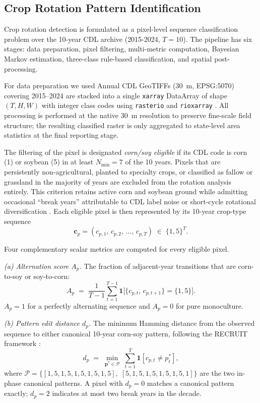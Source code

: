 \documentclass{article}
\begin{document}
\subsection{Crop Rotation Pattern Identification}
\label{sec:pattern_id}

Crop rotation detection is formulated as a pixel-level sequence classification
problem over the 10-year CDL archive (2015-2024, $T=10$).
The pipeline has six stages: data preparation, pixel filtering,
multi-metric computation, Bayesian Markov estimation, three-class rule-based
classification, and spatial post-processing.

For data preparation we used Annual CDL GeoTIFFs (30~m, EPSG:5070) covering 2015--2024 are stacked into
a single \texttt{xarray} DataArray of shape $(T,H,W)$ with integer class codes
using \texttt{rasterio} \citep{rasterio} and \texttt{rioxarray} \citep{rioxarray}.
All processing is performed at the native 30~m resolution to preserve fine-scale
field structure; the resulting classified raster is only aggregated to state-level
area statistics at the final reporting stage.

The filtering of the pixel is designated \emph{corn/soy eligible} if its CDL code is corn (1) or soybean (5) in at least $N_{\min}=7$ of the 10 years.
Pixels that are persistently non-agricultural, planted to specialty crops, or
classified as fallow or grassland in the majority of years are excluded from the
rotation analysis entirely.
This criterion retains active corn and soybean ground while admitting occasional
``break years'' attributable to CDL label noise or short-cycle rotational
diversification \citep{stern2012iowa}.
Each eligible pixel is then represented by its 10-year crop-type sequence
\begin{equation}
    \mathbf{c}_p = (c_{p,1},\,c_{p,2},\,\ldots,\,c_{p,T})
    \;\in\;\{1,5\}^T.
\end{equation}

Four complementary scalar metrics are computed for every eligible pixel.

\emph{(a) Alternation score $A_p$.}
The fraction of adjacent-year transitions that are corn-to-soy or soy-to-corn:
\begin{equation}
    A_p \;=\; \frac{1}{T-1}\sum_{t=1}^{T-1}
    \mathbf{1}\!\bigl[\{c_{p,t},\,c_{p,t+1}\} = \{1,5\}\bigr].
    \label{eq:alt_score}
\end{equation}
$A_p = 1$ for a perfectly alternating sequence and $A_p = 0$ for pure monoculture.

\emph{(b) Pattern edit distance $d_p$.}
The minimum Hamming distance from the observed sequence to either canonical
10-year corn-soy pattern, following the RECRUIT framework
\citep{sahajpal2014recruit}:
\begin{equation}
    d_p \;=\; \min_{\mathbf{p}^* \in \mathcal{P}}\;\sum_{t=1}^{T}
    \mathbf{1}[c_{p,t} \neq p^*_t],
    \label{eq:edit_dist}
\end{equation}
where
$\mathcal{P} = \{[1,5,1,5,1,5,1,5,1,5],\;[5,1,5,1,5,1,5,1,5,1]\}$
are the two in-phase canonical patterns.
A pixel with $d_p = 0$ matches a canonical pattern exactly; $d_p = 2$ indicates
at most two break years in the decade.
\end{document}
